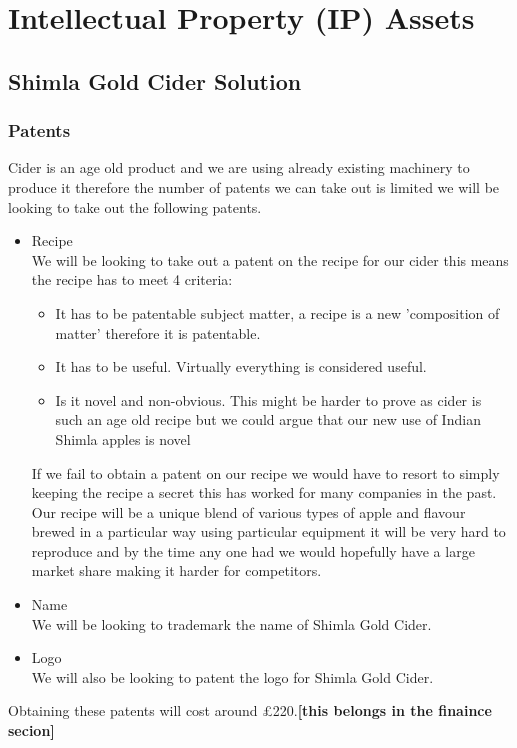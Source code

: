 \documentclass[11pt]{article}
\begin{document}
\newpage
\section{Intellectual Property (IP) Assets}
  \subsection{Shimla Gold Cider Solution}
    \subsubsection{Patents}
    Cider is an age old product and we are using already existing machinery to
    produce it therefore the number of patents we can take out is limited we will
    be looking to take out the following patents.
    \begin{itemize}
    	\item Recipe \\
We will be looking to take out a patent on the recipe for our cider this means the recipe has to meet 4 criteria:
 	      \begin{itemize}
		    \item It has to be patentable subject matter, a recipe is a new 'composition of matter' therefore it is patentable.
		    \item It has to be useful. Virtually everything is considered useful.
		    \item Is it novel and non-obvious. This might be harder to prove as cider is such an age old recipe but we could argue that our new use of Indian Shimla apples is novel
	      \end{itemize}
If we fail to obtain a patent on our recipe we would have to resort to simply keeping the recipe a secret this has worked for many companies in the past. Our recipe will be a unique blend of various types of apple and flavour brewed in a particular way using particular equipment it will be very hard to reproduce and by the time any one had we would hopefully have a large market share making it harder for competitors.
	\item Name \\
    We will be looking to trademark the name of Shimla Gold Cider.
	\item Logo \\
    We will also be looking to patent the logo for Shimla Gold Cider.
    \end{itemize}
Obtaining these patents will cost around £220.\textbf{[this belongs in the finaince secion]}
\end{document}
